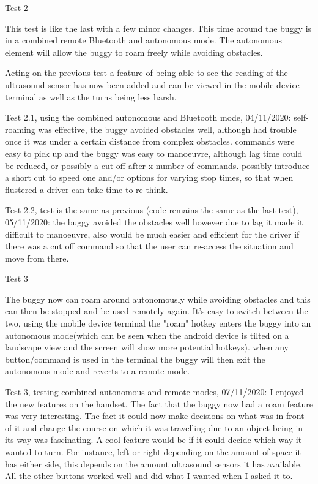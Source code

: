 \documentclass[8pt, a4paper]{article}
\begin{document}
Test 2

This test is like the last with a few minor changes. This time around the buggy is in a combined remote Bluetooth and autonomous mode. The autonomous element will allow the buggy to roam freely while avoiding obstacles.

Acting on the previous test a feature of being able to see the reading of the ultrasound sensor has now been added and can be viewed in the mobile device terminal as well as the turns being less harsh.

Test 2.1, using the combined autonomous and Bluetooth mode, 04/11/2020: self-roaming was effective, the buggy avoided obstacles well, although had trouble once it was under a certain distance from complex obstacles. commands were easy to pick up and the buggy was easy to manoeuvre, although lag time could be reduced, or possibly a cut off after x number of commands. possibly introduce a short cut to speed one and/or options for varying stop times, so that when flustered a driver can take time to re-think.

Test 2.2, test is the same as previous (code remains the same as the last test), 05/11/2020: the buggy avoided the obstacles well however due to lag it made it difficult to manoeuvre, also would be much easier and efficient for the driver if there was a cut off command so that the user can re-access the situation and move from there.  

Test 3

The buggy now can roam around autonomously while avoiding obstacles and this can then be stopped and be used remotely again. It’s easy to switch between the two, using the mobile device terminal the "roam" hotkey enters the buggy into an autonomous mode(which can be seen when the android device is tilted on a landscape view and the screen will show more potential hotkeys). when any button/command is used in the terminal the buggy will then exit the autonomous mode and reverts to a remote mode. 

Test 3, testing combined autonomous and remote modes, 07/11/2020: I enjoyed the new features on the handset. The fact that the buggy now had a roam feature was very interesting. The fact it could now make decisions on what was in front of it and change the course on which it was travelling due to an object being in its way was fascinating. A cool feature would be if it could decide which way it wanted to turn. For instance, left or right depending on the amount of space it has either side, this depends on the amount ultrasound sensors it has available. All the other buttons worked well and did what I wanted when I asked it to. 
\end{document}
